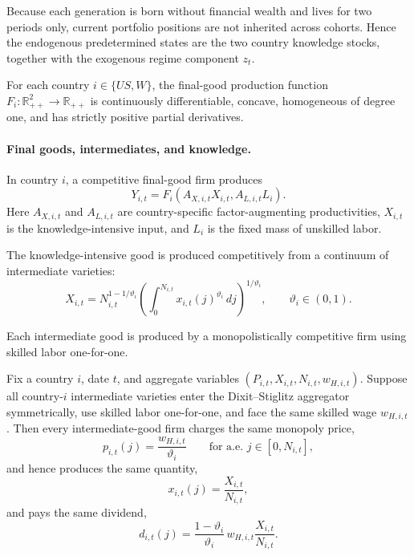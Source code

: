 \documentclass{article}
\begin{document}
Because each generation is born without financial wealth and lives for two periods only, current portfolio positions are not inherited across cohorts. Hence the endogenous predetermined states are the two country knowledge stocks, together with the exogenous regime component $z_t$.

\begin{ass}\label{ass_country_technology}
For each country $i\in\{US,W\}$, the final-good production function $F_i:\mathbb R_{++}^2\to\mathbb R_{++}$ is continuously differentiable, concave, homogeneous of degree one, and has strictly positive partial derivatives.
\end{ass}

\paragraph{Final goods, intermediates, and knowledge.}
In country $i$, a competitive final-good firm produces
\begin{equation}\label{country_final_good}
Y_{i,t}=F_i(A_{X,i,t}X_{i,t},A_{L,i,t}L_i).
\end{equation}
Here $A_{X,i,t}$ and $A_{L,i,t}$ are country-specific factor-augmenting productivities, $X_{i,t}$ is the knowledge-intensive input, and $L_i$ is the fixed mass of unskilled labor.

The knowledge-intensive good is produced competitively from a continuum of intermediate varieties:
\begin{equation}\label{country_knowledge_good}
X_{i,t}=N_{i,t}^{1-1/\vartheta_i}
\left(\int_0^{N_{i,t}} x_{i,t}(j)^{\vartheta_i}\,dj\right)^{1/\vartheta_i},
\qquad
\vartheta_i\in(0,1).
\end{equation}

Each intermediate good is produced by a monopolistically competitive firm using skilled labor one-for-one.

\begin{lem}\label{lem_within_country_prod_symmetry}
Fix a country $i$, date $t$, and aggregate variables
$(P_{i,t},X_{i,t},N_{i,t},w_{H,i,t})$. Suppose all country-$i$
intermediate varieties enter the Dixit--Stiglitz aggregator symmetrically,
use skilled labor one-for-one, and face the same skilled wage $w_{H,i,t}$.
Then every intermediate-good firm charges the same monopoly price,
\[
p_{i,t}(j)=\frac{w_{H,i,t}}{\vartheta_i}
\qquad\text{for a.e. }j\in[0,N_{i,t}],
\]
and hence produces the same quantity,
\[
x_{i,t}(j)=\frac{X_{i,t}}{N_{i,t}},
\]
and pays the same dividend,
\[
d_{i,t}(j)
=
\frac{1-\vartheta_i}{\vartheta_i}\,
w_{H,i,t}\frac{X_{i,t}}{N_{i,t}}.
\]
\end{lem}
\end{document}
